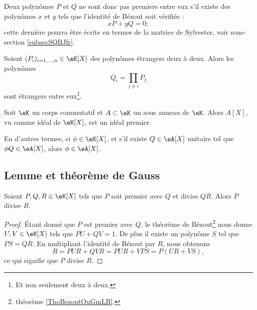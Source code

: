 Deux polynômes \( P\) et \( Q\) ne sont donc pas premiers entre eux s'il existe des polynômes \( x\) et \( y\) tels que l'identité de Bézout soit vérifiée :
\begin{equation}    \label{EqkbbzAi}
    xP+yQ=0;
\end{equation}
cette dernière pourra être écrite en termes de la matrice de Sylvester, voir sous-section \ref{subsecSQBJfr}.

\begin{lemma}       \label{LemuALZHn}
    Soient \( (P_i)_{i=1,\ldots,n}\in \eK[X]\) des polynômes étrangers deux à deux. Alors les polynômes \begin{equation} Q_i=\prod_{j\neq i}P_j \end{equation}
    sont étrangers entre eux\footnote{Et non seulement deux à deux.}.
\end{lemma}

\begin{lemma}   \label{LemzwkYdn}
    Soit \( \eK\) un corps commutatif et \( A\subset \eK\) un sous
    anneau de \( \eK\).  Alors \( A[X] \), vu comme idéal de \( \eK[X]
    \), est un idéal premier.

    En d'autres termes, si \( \phi\in \eK[X]\), et s'il existe \( Q\in \eA[X]\) unitaire tel que \( \phi Q\in \eA[X]\), alors \( \phi\in \eA[X]\).
\end{lemma}

\subsection{Lemme et théorème de Gauss}

\begin{theorem}  \label{ThoLLgIsig}
    Soient \( P,Q,R\in \eK[X]\) tels que \( P\) soit premier avec \( Q\) et divise \( QR\). Alors \( P\) divise \( R\).
\end{theorem}

\begin{proof}
    Étant donné que \( P\) est premier avec \( Q\), le théorème de Bézout\footnote{théorème \ref{ThoBezoutOuGmLB}.} nous donne \( U,V\in \eK[X]\) tels que \( PU+QV=1\). De plus il existe un polynôme \( S\) tel que \( PS=QR\). En multipliant l'identité de Bézout par \( R\), nous obtenons
    \begin{equation}
        R=PUR+QVR=PUR+VPS=P(UR+VS),
    \end{equation}
    ce qui signifie que \( P\) divise \( R\).
\end{proof}

